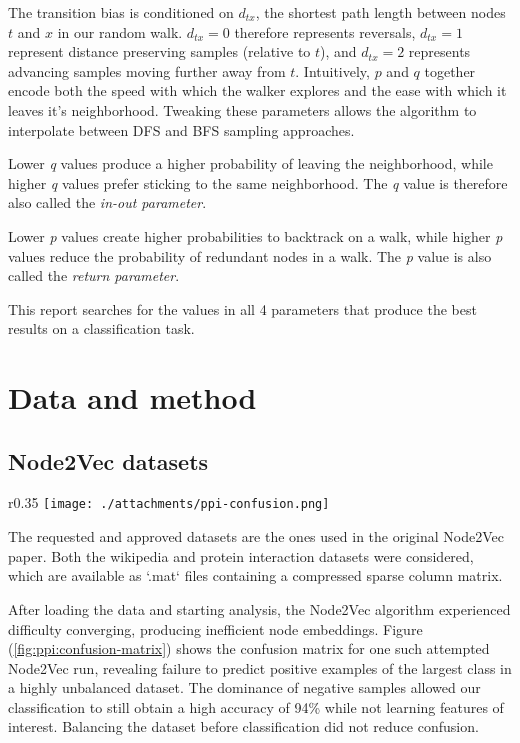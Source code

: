 \documentclass[a4paper,10pt]{article}
\begin{document}
The transition bias is conditioned on $d_{tx}$, the shortest path length between nodes $t$ and $x$ in our random walk. $d_{tx} = 0$ therefore represents reversals, $d_{tx} = 1$ represent distance preserving samples (relative to $t$), and $d_{tx} = 2$ represents advancing samples moving further away from $t$. Intuitively, $p$ and $q$ together encode both the speed with which the walker explores and the ease with which it leaves it's neighborhood. Tweaking these parameters allows the algorithm to interpolate between DFS and BFS sampling approaches.

Lower \textit{q} values produce a higher probability of leaving the neighborhood, while higher \textit{q} values prefer sticking to the same neighborhood. The \textit{q} value is therefore also called the \textit{in-out parameter}.

Lower \textit{p} values create higher probabilities to backtrack on a walk, while higher \textit{p} values reduce the probability of redundant nodes in a walk. The \textit{p} value is also called the \textit{return parameter}.

This report searches for the values in all 4 parameters that produce the best results on a classification task.

\section{Data and method}

\subsection{Node2Vec datasets}

\begin{wrapfigure}{r}{0.35\textwidth}
  \centering
  \vspace{-8mm}
      \texttt{[image: ./attachments/ppi-confusion.png]}
        \caption{Confusion matrix for PPI dataset}
        \label{fig:ppi:confusion-matrix}
\end{wrapfigure}

The requested and approved datasets are the ones used in the original Node2Vec paper. Both the wikipedia and protein interaction datasets were considered, which are available as `.mat` files containing a compressed sparse column matrix.

After loading the data and starting analysis, the Node2Vec algorithm experienced difficulty converging, producing inefficient node embeddings. Figure (\ref{fig:ppi:confusion-matrix}) shows the confusion matrix for one such attempted Node2Vec run, revealing failure to predict positive examples of the largest class in a highly unbalanced dataset. The dominance of negative samples allowed our classification to still obtain a high accuracy of 94\% while not learning features of interest. Balancing the dataset before classification did not reduce confusion.
\end{document}
